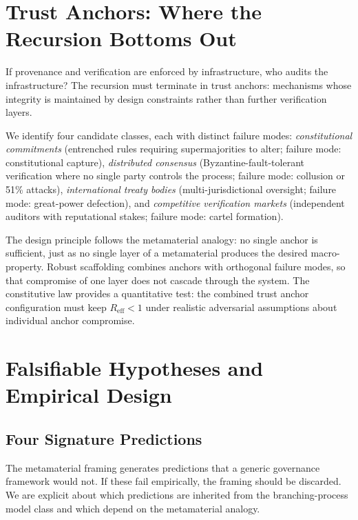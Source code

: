 \documentclass[runningheads]{llncs}
\begin{document}
\section{Trust Anchors: Where the Recursion Bottoms Out}
\label{sec:trust}

If provenance and verification are enforced by infrastructure, who audits the infrastructure? The recursion must terminate in trust anchors: mechanisms whose integrity is maintained by design constraints rather than further verification layers.

We identify four candidate classes, each with distinct failure modes: \emph{constitutional commitments} (entrenched rules requiring supermajorities to alter; failure mode: constitutional capture), \emph{distributed consensus} (Byzantine-fault-tolerant verification where no single party controls the process; failure mode: collusion or 51\% attacks), \emph{international treaty bodies} (multi-jurisdictional oversight; failure mode: great-power defection), and \emph{competitive verification markets} (independent auditors with reputational stakes; failure mode: cartel formation).

The design principle follows the metamaterial analogy: no single anchor is sufficient, just as no single layer of a metamaterial produces the desired macro-property. Robust scaffolding combines anchors with orthogonal failure modes, so that compromise of one layer does not cascade through the system. The constitutive law provides a quantitative test: the combined trust anchor configuration must keep $R_{\mathrm{eff}} < 1$ under realistic adversarial assumptions about individual anchor compromise.


\section{Falsifiable Hypotheses and Empirical Design}
\label{sec:empirical}

\subsection{Four Signature Predictions}

The metamaterial framing generates predictions that a generic governance framework would not. If these fail empirically, the framing should be discarded. We are explicit about which predictions are inherited from the branching-process model class and which depend on the metamaterial analogy.
\end{document}
